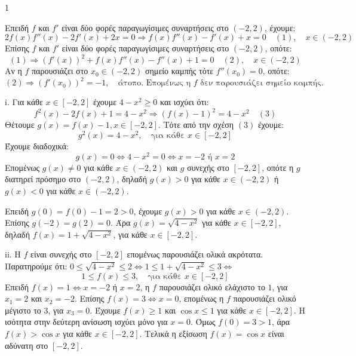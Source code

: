 \begin{ylh}{1}
    \item [Συναρτήσεις - Όρια - Συνέχεια - Διαφορικός Λογισμός]
\end{ylh}
Επειδή $f$ και $f'$ είναι δύο φορές παραγωγίσιμες συναρτήσεις στο $(-2,2)$, έχουμε:
\[ 2f(x)f''(x) - 2f'(x) + 2x = 0 \Rightarrow f(x)f''(x) - f'(x) + x = 0 \quad (1), \quad x \in (-2,2) \]
Επίσης $f$ και $f'$ είναι δύο φορές παραγωγίσιμες συναρτήσεις στο $(-2,2)$, οπότε:
\[ (1) \Rightarrow (f'(x))^2 + f(x)f''(x) - f''(x) + 1 = 0 \quad (2), \quad x \in (-2,2) \]
Αν η $f$ παρουσιάζει στο $x_0 \in (-2,2)$ σημείο καμπής τότε $f''(x_0) = 0$, οπότε:
\[ (2) \Rightarrow (f'(x_0))^2 = -1, \quad \text{άτοπο. Επομένως η } f \text{ δεν παρουσιάζει σημείο καμπής.} \]

\begin{alist}
    \item [Πληροφορίες από εικόνα]
    \item i. Για κάθε $x \in [-2,2]$ έχουμε $4-x^2 \ge 0$ και ισχύει ότι:
    \[ f^2(x) - 2f(x) + 1 = 4 - x^2 \Rightarrow (f(x)-1)^2 = 4-x^2 \quad (3) \]
    Θέτουμε $g(x) = f(x) - 1, x \in [-2,2]$. Τότε από την σχέση $(3)$ έχουμε:
    \[ g^2(x) = 4-x^2, \quad \text{για κάθε } x \in [-2,2] \]
    Έχουμε διαδοχικά:
    \[ g(x) = 0 \Leftrightarrow 4-x^2 = 0 \Leftrightarrow x = -2 \text{ ή } x = 2 \]
    Επομένως $g(x) \ne 0$ για κάθε $x \in (-2,2)$ και $g$ συνεχής στο $[-2,2]$, οπότε η $g$ διατηρεί πρόσημο στο $(-2,2)$, δηλαδή $g(x) > 0$ για κάθε $x \in (-2,2)$ ή $g(x) < 0$ για κάθε $x \in (-2,2)$.

    Επειδή $g(0) = f(0)-1 = 2 > 0$, έχουμε $g(x) > 0$ για κάθε $x \in (-2,2)$.
    Επίσης $g(-2) = g(2) = 0$.
    Άρα $g(x) = \sqrt{4-x^2}$ για κάθε $x \in [-2,2]$, δηλαδή $f(x) = 1 + \sqrt{4-x^2}$, για κάθε $x \in [-2,2]$.

    \item ii. Η $f$ είναι συνεχής στο $[-2,2]$ επομένως παρουσιάζει ολικά ακρότατα.
    Παρατηρούμε ότι: $0 \le \sqrt{4-x^2} \le 2 \Leftrightarrow 1 \le 1+\sqrt{4-x^2} \le 3 \Leftrightarrow$
    \[ 1 \le f(x) \le 3, \quad \text{για κάθε } x \in [-2,2] \]
    Επειδή $f(x) = 1 \Leftrightarrow x=-2$ ή $x=2$, η $f$ παρουσιάζει ολικό ελάχιστο το $1$, για $x_1 = 2$ και $x_2 = -2$.
    Επίσης $f(x) = 3 \Leftrightarrow x=0$, επομένως η $f$ παρουσιάζει ολικό μέγιστο το $3$, για $x_3 = 0$.
    Έχουμε $f(x) \ge 1$ και $\cos x \le 1$ για κάθε $x \in [-2,2]$. Η ισότητα στην δεύτερη ανίσωση ισχύει μόνο για $x = 0$.
    Όμως $f(0) = 3 > 1$, άρα $f(x) > \cos x$ για κάθε $x \in [-2,2]$.
    Τελικά η εξίσωση $f(x) = \cos x$ είναι αδύνατη στο $[-2,2]$.
\end{alist}